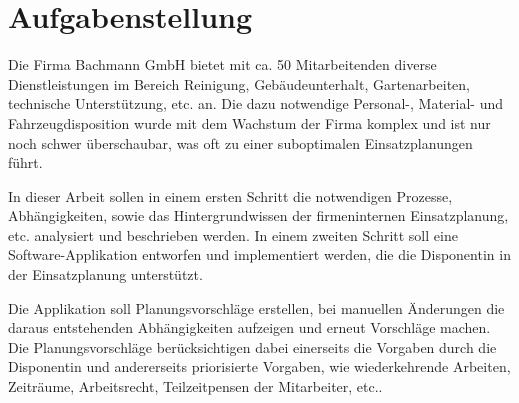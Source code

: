 \chapter*{Aufgabenstellung}

Die Firma Bachmann GmbH bietet mit ca. 50 Mitarbeitenden diverse Dienstleistungen im Bereich Reinigung, Gebäudeunterhalt, Gartenarbeiten, technische Unterstützung, etc. an. Die dazu notwendige Personal-, Material- und Fahrzeugdisposition wurde mit dem Wachstum der Firma komplex und ist nur noch schwer überschaubar, was oft zu einer suboptimalen Einsatzplanungen führt.

In dieser Arbeit sollen in einem ersten Schritt die notwendigen Prozesse, Abhängigkeiten, sowie das Hintergrundwissen der firmeninternen Einsatzplanung, etc. analysiert und beschrieben werden. In einem zweiten Schritt soll eine Software-Applikation entworfen und implementiert werden, die die Disponentin in der Einsatzplanung unterstützt.

Die Applikation soll Planungsvorschläge erstellen, bei manuellen Änderungen die daraus entstehenden Abhängigkeiten aufzeigen und erneut Vorschläge machen. Die Planungsvorschläge berücksichtigen dabei einerseits die Vorgaben durch die Disponentin und andererseits priorisierte Vorgaben, wie wiederkehrende Arbeiten, Zeiträume, Arbeitsrecht, Teilzeitpensen der Mitarbeiter, etc.. 
